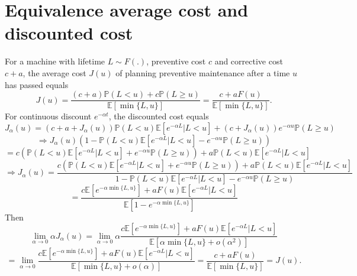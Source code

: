 \section{Equivalence average cost and discounted cost}
For a machine with lifetime $L \sim F(.)$, preventive cost $c$ and corrective cost $c+a$, the average cost $J(u)$ of planning preventive maintenance after a time $u$ has passed equals
$$
J(u)=\frac{(c+a)\mathbb{P}(L<u)+c\mathbb{P}(L\geq u)}{\mathbb{E}[\min\{L,u\}]}
=\frac{c+aF(u)}{\mathbb{E}[\min\{L,u\}]}.
$$
For continuous discount $e^{-\alpha t}$, the discounted cost equals
$$
J_\alpha(u)=(c+a+J_\alpha(u))\mathbb{P}(L<u)\mathbb{E}[e^{-\alpha L}|L<u] + (c+J_\alpha(u))e^{-\alpha u}\mathbb{P}(L\geq u)
$$
$$
\Rightarrow J_\alpha(u)(1-\mathbb{P}(L<u)\mathbb{E}[e^{-\alpha L}|L<u]-e^{-\alpha u}\mathbb{P}(L\geq u))
$$
$$
=c(\mathbb{P}(L<u)\mathbb{E}[e^{-\alpha L}|L<u]+e^{-\alpha u}\mathbb{P}(L\geq u))+a\mathbb{P}(L<u)\mathbb{E}[e^{-\alpha L}|L<u]
$$
$$
\Rightarrow J_\alpha(u)=\frac{c(\mathbb{P}(L<u)\mathbb{E}[e^{-\alpha L}|L<u]+e^{-\alpha u}\mathbb{P}(L\geq u))+a\mathbb{P}(L<u)\mathbb{E}[e^{-\alpha L}|L<u]}{1-\mathbb{P}(L<u)\mathbb{E}[e^{-\alpha L}|L<u]-e^{-\alpha u}\mathbb{P}(L\geq u)}
$$
$$
=\frac{c\mathbb{E}[e^{-\alpha\min\{L,u\}}]+aF(u)\mathbb{E}[e^{-\alpha L}|L<u]}{\mathbb{E}[1-e^{-\alpha \min\{L,u\}}]}
$$
Then 
$$
\lim\limits_{\alpha\rightarrow 0} \alpha J_\alpha(u)=\lim\limits_{\alpha\rightarrow 0}\alpha\frac{c\mathbb{E}[e^{-\alpha\min\{L,u\}}]+aF(u)\mathbb{E}[e^{-\alpha L}|L<u]}{\mathbb{E}[\alpha \min\{L,u\}+o(\alpha^2)]}
$$
$$
=\lim\limits_{\alpha\rightarrow 0}\frac{c\mathbb{E}[e^{-\alpha\min\{L,u\}}]+aF(u)\mathbb{E}[e^{-\alpha L}|L<u]}{\mathbb{E}[ \min\{L,u\}+o(\alpha)]}=\frac{c+aF(u)}{\mathbb{E}[\min\{L,u\}]}=J(u).
$$
